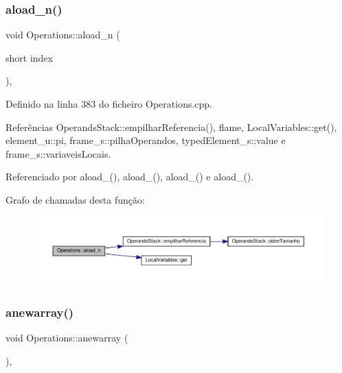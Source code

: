 \subsubsection{\texorpdfstring{aload\+\_\+n()}{aload\_n()}}
{\footnotesize\ttfamily void Operations\+::aload\+\_\+n (\begin{DoxyParamCaption}\item[{short}]{index }\end{DoxyParamCaption})\hspace{0.3cm}{\ttfamily [static]}, {\ttfamily [private]}}



Definido na linha 383 do ficheiro Operations.\+cpp.



Referências Operands\+Stack\+::empilhar\+Referencia(), flame, Local\+Variables\+::get(), element\+\_\+u\+::pi, frame\+\_\+s\+::pilha\+Operandos, typed\+Element\+\_\+s\+::value e frame\+\_\+s\+::variaveis\+Locais.



Referenciado por aload\+\_(), aload\+\_(), aload\+\_() e aload\+\_().

Grafo de chamadas desta função\+:
\nopagebreak
\begin{figure}[H]
\begin{center}
\leavevmode
\includegraphics[width=350pt]{classOperations_ad148cdfeb25166f5c097cee60ea36325_cgraph}
\end{center}
\end{figure}
\mbox{\label{classOperations_aa5110e66aa565e9130be292935ef5c71}} 
\subsubsection{\texorpdfstring{anewarray()}{anewarray()}}
{\footnotesize\ttfamily void Operations\+::anewarray (\begin{DoxyParamCaption}{ }\end{DoxyParamCaption})\hspace{0.3cm}{\ttfamily [static]}, {\ttfamily [private]}}



